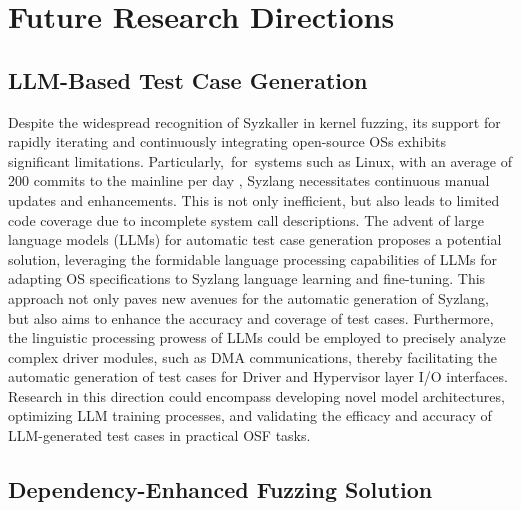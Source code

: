 
\section{Future Research Directions}\label{Section7}

\subsection{LLM-Based Test Case Generation}

Despite the widespread recognition of Syzkaller in kernel fuzzing, its support for rapidly iterating and continuously integrating open-source OSs exhibits significant limitations. Particularly,~for~systems such as Linux, with an average of 200 commits to the mainline per day \cite{Hao2022DemystifyingTD}, Syzlang necessitates continuous manual updates and enhancements. This is not only inefficient, but also leads to limited code coverage due to incomplete system call descriptions. The advent of large language models (LLMs) for automatic test case generation proposes a potential solution, leveraging the formidable language processing capabilities of LLMs for adapting OS specifications to Syzlang language learning and fine-tuning. This approach not only paves new avenues for the automatic generation of Syzlang, but also aims to enhance the accuracy and coverage of test cases. Furthermore, the linguistic processing prowess of LLMs could be employed to precisely analyze complex driver modules, such as DMA communications, thereby facilitating the automatic generation of test cases for Driver and Hypervisor layer I/O interfaces. Research in this direction could encompass developing novel model architectures, optimizing LLM training processes, and validating the efficacy and accuracy of LLM-generated test cases in practical OSF tasks.

\subsection{Dependency-Enhanced Fuzzing Solution}

